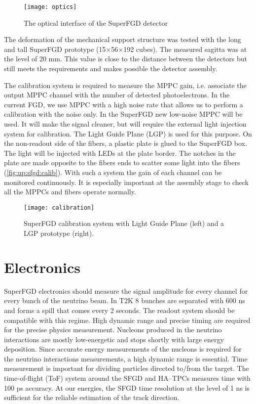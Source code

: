 \documentclass[main.tex]{subfiles}
\begin{document}
\begin{figure}[!ht]
	\centering
	\texttt{[image: optics]}
	\caption{The optical interface of the SuperFGD detector}
	\label{fig:up:sfgd:optics}
\end{figure}

The deformation of the mechanical support structure was tested with the long and tall SuperFGD prototype (15$\times$56$\times$192 cubes). The measured sagitta was at the level of 20 mm. This value is close to the distance between the detectors but still meets the requirements and makes possible the detector assembly.

The calibration system is required to measure the MPPC gain, i.e. associate the output MPPC channel with the number of detected photoelectrons. In the current FGD, we use MPPC with a high noise rate that allows us to perform a calibration with the noise only. In the SuperFGD new low-noise MPPC will be used. It will make the signal cleaner, but will require the external light injection system for calibration. The Light Guide Plane (LGP) is used for this purpose. On the non-readout side of the fibers, a plastic plate is glued to the SuperFGD box. The light will be injected with LEDs at the plate border. The notches in the plate are made opposite to the fibers ends to scatter some light into the fibers (\autoref{fig:up:sfgd:calib}). With such a system the gain of each channel can be monitored continuously. It is especially important at the assembly stage to check all the MPPCs and fibers operate normally.

\begin{figure}[!ht]
	\centering
	\texttt{[image: calibration]}
	\caption{SuperFGD calibration system with Light Guide Plane (left) and a LGP prototype (right).}
	\label{fig:up:sfgd:calib}
\end{figure}

\section{Electronics}
\label{sec:up:sfgd:ele}
SuperFGD electronics should measure the signal amplitude for every channel for every bunch of the neutrino beam. In T2K 8 bunches are separated with 600 ns and forms a spill that comes every 2 seconds. The readout system should be compatible with this regime. High dynamic range and precise timing are required for the precise physics measurement. Nucleons produced in the neutrino interactions are mostly low-energetic and stops shortly with large energy deposition. Since accurate energy measurements of the nucleons is required for the neutrino interactions measurements, a high dynamic range is essential. Time measurement is important for dividing particles directed to/from the target. The time-of-flight (ToF) system around the SFGD and HA--TPCs measures time with 100 ps accuracy. At our energies, the SFGD time resolution at the level of 1 ns is sufficient for the reliable estimation of the track direction.
\end{document}
